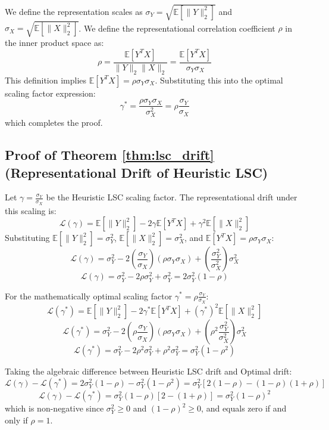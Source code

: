 \documentclass{article}
\theoremstyle{plain}
\theoremstyle{definition}
\theoremstyle{remark}
\begin{document}
We define the representation scales as $\sigma_Y = \sqrt{\mathbb{E}[\|Y\|_2^2]}$ and $\sigma_X = \sqrt{\mathbb{E}[\|X\|_2^2]}$. We define the representational correlation coefficient $\rho$ in the inner product space as:
$$\rho = \frac{\mathbb{E}[Y^T X]}{\|Y\|_2 \|X\|_2} = \frac{\mathbb{E}[Y^T X]}{\sigma_Y \sigma_X}$$
This definition implies $\mathbb{E}[Y^T X] = \rho \sigma_Y \sigma_X$. Substituting this into the optimal scaling factor expression:
$$\gamma^* = \frac{\rho \sigma_Y \sigma_X}{\sigma_X^2} = \rho \frac{\sigma_Y}{\sigma_X}$$
which completes the proof.

\subsection{Proof of Theorem \ref{thm:lsc_drift} (Representational Drift of Heuristic LSC)}
Let $\gamma = \frac{\sigma_Y}{\sigma_X}$ be the Heuristic LSC scaling factor. The representational drift under this scaling is:
$$\mathcal{L}(\gamma) = \mathbb{E}[\|Y\|_2^2] - 2\gamma \mathbb{E}[Y^T X] + \gamma^2 \mathbb{E}[\|X\|_2^2]$$
Substituting $\mathbb{E}[\|Y\|_2^2] = \sigma_Y^2$, $\mathbb{E}[\|X\|_2^2] = \sigma_X^2$, and $\mathbb{E}[Y^T X] = \rho \sigma_Y \sigma_X$:
$$\mathcal{L}(\gamma) = \sigma_Y^2 - 2 \left(\frac{\sigma_Y}{\sigma_X}\right) (\rho \sigma_Y \sigma_X) + \left(\frac{\sigma_Y^2}{\sigma_X^2}\right) \sigma_X^2$$
$$\mathcal{L}(\gamma) = \sigma_Y^2 - 2 \rho \sigma_Y^2 + \sigma_Y^2 = 2 \sigma_Y^2 (1 - \rho)$$

For the mathematically optimal scaling factor $\gamma^* = \rho \frac{\sigma_Y}{\sigma_X}$:
$$\mathcal{L}(\gamma^*) = \mathbb{E}[\|Y\|_2^2] - 2\gamma^* \mathbb{E}[Y^T X] + (\gamma^*)^2 \mathbb{E}[\|X\|_2^2]$$
$$\mathcal{L}(\gamma^*) = \sigma_Y^2 - 2 \left(\rho \frac{\sigma_Y}{\sigma_X}\right) (\rho \sigma_Y \sigma_X) + \left(\rho^2 \frac{\sigma_Y^2}{\sigma_X^2}\right) \sigma_X^2$$
$$\mathcal{L}(\gamma^*) = \sigma_Y^2 - 2 \rho^2 \sigma_Y^2 + \rho^2 \sigma_Y^2 = \sigma_Y^2 (1 - \rho^2)$$

Taking the algebraic difference between Heuristic LSC drift and Optimal drift:
$$\mathcal{L}(\gamma) - \mathcal{L}(\gamma^*) = 2 \sigma_Y^2 (1 - \rho) - \sigma_Y^2 (1 - \rho^2) = \sigma_Y^2 \left[ 2(1-\rho) - (1-\rho)(1+\rho) \right]$$
$$\mathcal{L}(\gamma) - \mathcal{L}(\gamma^*) = \sigma_Y^2 (1-\rho) [2 - (1+\rho)] = \sigma_Y^2 (1-\rho)^2$$
which is non-negative since $\sigma_Y^2 \ge 0$ and $(1-\rho)^2 \ge 0$, and equals zero if and only if $\rho=1$.
\end{document}
